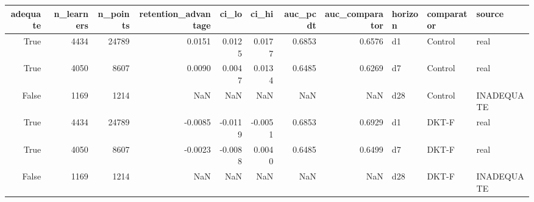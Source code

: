 \begin{tabular}{rrrrrrrrlll}
\toprule
adequate & n\_learners & n\_points & retention\_advantage & ci\_lo & ci\_hi & auc\_pcdt & auc\_comparator & horizon & comparator & source \\
\midrule
True & 4434 & 24789 & 0.0151 & 0.0125 & 0.0177 & 0.6853 & 0.6576 & d1 & Control & real \\
True & 4050 & 8607 & 0.0090 & 0.0047 & 0.0134 & 0.6485 & 0.6269 & d7 & Control & real \\
False & 1169 & 1214 & NaN & NaN & NaN & NaN & NaN & d28 & Control & INADEQUATE \\
True & 4434 & 24789 & -0.0085 & -0.0119 & -0.0051 & 0.6853 & 0.6929 & d1 & DKT-F & real \\
True & 4050 & 8607 & -0.0023 & -0.0088 & 0.0040 & 0.6485 & 0.6499 & d7 & DKT-F & real \\
False & 1169 & 1214 & NaN & NaN & NaN & NaN & NaN & d28 & DKT-F & INADEQUATE \\
\bottomrule
\end{tabular}
